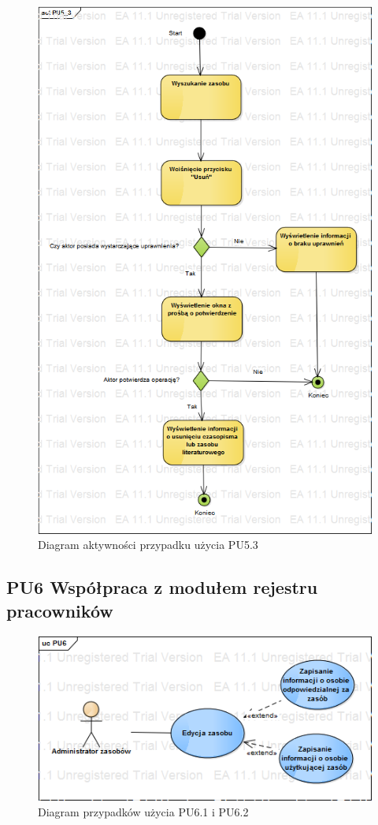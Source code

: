 \begin{figure}[h!]
	\centering
	\includegraphics[scale=0.6]{img/diagrams/activityDiagrams/PU5_3}
	\caption{Diagram aktywności przypadku użycia PU5.3 \label{fig:labelADPU5.3}}
\end{figure}

\subsection{PU6 Współpraca z modułem rejestru pracowników} \label{pu6}
\begin{figure}[h!]
	\centering
	\includegraphics[scale=0.6]{img/diagrams/useCaseDiagrams/PU6.png}
	\caption{Diagram przypadków użycia PU6.1 i PU6.2 \label{fig:labelUCPU6}}
\end{figure}

